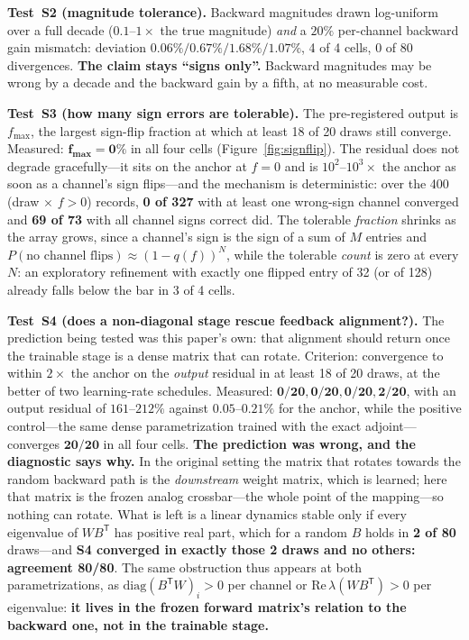 \documentclass[11pt]{article}
\begin{document}
\textbf{Test~S2 (magnitude tolerance).} Backward magnitudes drawn log-uniform over a full decade ($0.1$--$1\times$ the true magnitude) \textit{and} a $20\%$ per-channel backward gain mismatch: deviation $\mathbf{0.06\% / 0.67\% / 1.68\% / 1.07\%}$, 4 of 4 cells, 0 of 80 divergences. \textbf{The claim stays ``signs only''.} Backward magnitudes may be wrong by a decade and the backward gain by a fifth, at no measurable cost.

\textbf{Test~S3 (how many sign errors are tolerable).} The pre-registered output is $f_{\max}$, the largest sign-flip fraction at which at least 18 of 20 draws still converge. Measured: $\mathbf{f_{\max} = 0\%}$ in all four cells (Figure~\ref{fig:signflip}). The residual does not degrade gracefully---it sits on the anchor at $f=0$ and is $10^2$--$10^3\times$ the anchor as soon as a channel's sign flips---and the mechanism is deterministic: over the 400 (draw $\times$ $f>0$) records, \textbf{0 of 327} with at least one wrong-sign channel converged and \textbf{69 of 73} with all channel signs correct did. The tolerable \textit{fraction} shrinks as the array grows, since a channel's sign is the sign of a sum of $M$ entries and $P(\text{no channel flips}) \approx (1-q(f))^N$, while the tolerable \textit{count} is zero at every $N$: an exploratory refinement with exactly one flipped entry of 32 (or of 128) already falls below the bar in 3 of 4 cells.

\textbf{Test~S4 (does a non-diagonal stage rescue feedback alignment?).} The prediction being tested was this paper's own: that alignment should return once the trainable stage is a dense matrix that can rotate. Criterion: convergence to within $2\times$ the anchor on the \textit{output} residual in at least 18 of 20 draws, at the better of two learning-rate schedules. Measured: $\mathbf{0/20, 0/20, 0/20, 2/20}$, with an output residual of $161$--$212\%$ against $0.05$--$0.21\%$ for the anchor, while the positive control---the same dense parametrization trained with the exact adjoint---converges $\mathbf{20/20}$ in all four cells. \textbf{The prediction was wrong, and the diagnostic says why.} In the original setting the matrix that rotates towards the random backward path is the \textit{downstream} weight matrix, which is learned; here that matrix is the frozen analog crossbar---the whole point of the mapping---so nothing can rotate. What is left is a linear dynamics stable only if every eigenvalue of $WB^{\mathsf T}$ has positive real part, which for a random $B$ holds in \textbf{2 of 80} draws---and \textbf{S4 converged in exactly those 2 draws and no others: agreement 80/80}. The same obstruction thus appears at both parametrizations, as $\mathrm{diag}(B^{\mathsf T}W)_i > 0$ per channel or $\mathrm{Re}\,\lambda(WB^{\mathsf T}) > 0$ per eigenvalue: \textbf{it lives in the frozen forward matrix's relation to the backward one, not in the trainable stage.}
\end{document}

